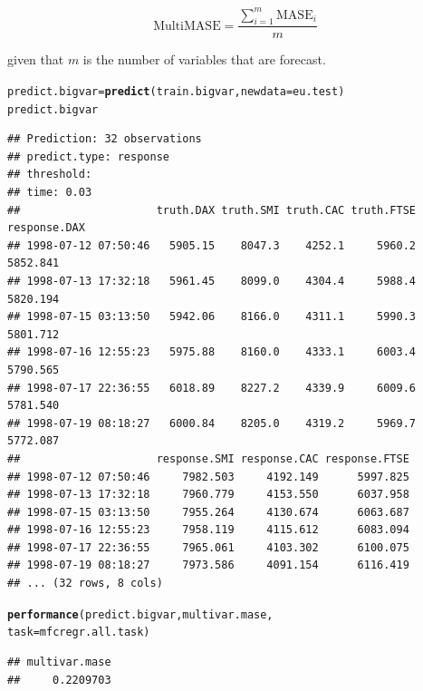 \documentclass[12pt]{article}\usepackage[]{graphicx}\usepackage[]{color}
\makeatletter
\newcommand{\hlstd}[1]{\textcolor[rgb]{0.345,0.345,0.345}{#1}}%
\newcommand{\hlkwb}[1]{\textcolor[rgb]{0.69,0.353,0.396}{#1}}%
\newcommand{\hlkwc}[1]{\textcolor[rgb]{0.333,0.667,0.333}{#1}}%
\newcommand{\hlkwd}[1]{\textcolor[rgb]{0.737,0.353,0.396}{\textbf{#1}}}%
\newenvironment{kframe}{%
 \def\at@end@of@kframe{}%
 \ifinner\ifhmode%
  \def\at@end@of@kframe{\end{minipage}}%
  \begin{minipage}{\columnwidth}%
 \fi\fi%
 \def\FrameCommand##1{\hskip\@totalleftmargin \hskip-\fboxsep
 \colorbox{shadecolor}{##1}\hskip-\fboxsep
     \hskip-\linewidth \hskip-\@totalleftmargin \hskip\columnwidth}%
 \MakeFramed {\advance\hsize-\width
   \@totalleftmargin\z@ \linewidth\hsize
   \@setminipage}}%
 {\par\unskip\endMakeFramed%
 \at@end@of@kframe}
\newenvironment{knitrout}{}{} %
\theoremstyle{definition}
\makeatother
\begin{document}
\begin{equation}
\text{MultiMASE} = \frac{\sum_{i=1}^m \text{MASE}_i}{m}
\end{equation}

given that $m$ is the number of variables that are forecast.

\singlespacing
\begin{knitrout}
\color{fgcolor}\begin{kframe}
\begin{alltt}
\hlstd{predict.bigvar} \hlkwb{=} \hlkwd{predict}\hlstd{(train.bigvar,} \hlkwc{newdata} \hlstd{= eu.test)}
\hlstd{predict.bigvar}
\end{alltt}
\begin{verbatim}
## Prediction: 32 observations
## predict.type: response
## threshold: 
## time: 0.03
##                     truth.DAX truth.SMI truth.CAC truth.FTSE response.DAX
## 1998-07-12 07:50:46   5905.15    8047.3    4252.1     5960.2     5852.841
## 1998-07-13 17:32:18   5961.45    8099.0    4304.4     5988.4     5820.194
## 1998-07-15 03:13:50   5942.06    8166.0    4311.1     5990.3     5801.712
## 1998-07-16 12:55:23   5975.88    8160.0    4333.1     6003.4     5790.565
## 1998-07-17 22:36:55   6018.89    8227.2    4339.9     6009.6     5781.540
## 1998-07-19 08:18:27   6000.84    8205.0    4319.2     5969.7     5772.087
##                     response.SMI response.CAC response.FTSE
## 1998-07-12 07:50:46     7982.503     4192.149      5997.825
## 1998-07-13 17:32:18     7960.779     4153.550      6037.958
## 1998-07-15 03:13:50     7955.264     4130.674      6063.687
## 1998-07-16 12:55:23     7958.119     4115.612      6083.094
## 1998-07-17 22:36:55     7965.061     4103.302      6100.075
## 1998-07-19 08:18:27     7973.586     4091.154      6116.419
## ... (32 rows, 8 cols)
\end{verbatim}
\begin{alltt}
\hlkwd{performance}\hlstd{(predict.bigvar, multivar.mase,}
            \hlkwc{task} \hlstd{= mfcregr.all.task)}
\end{alltt}
\begin{verbatim}
## multivar.mase 
##     0.2209703
\end{verbatim}
\end{kframe}
\end{knitrout}
\end{document}
